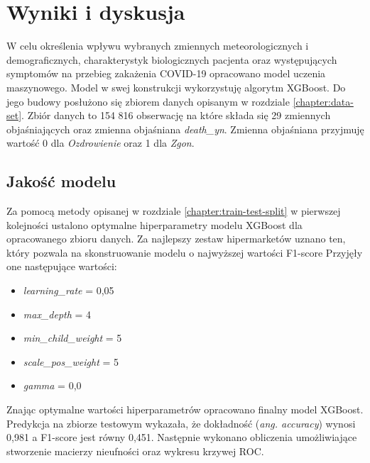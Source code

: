 \documentclass[polish, twoside, 12pt, a4paper]{article}
\theoremstyle{definition}
\theoremstyle{plain}
\theoremstyle{remark}
\begin{document}
\clearpage
\section{Wyniki i dyskusja}


W celu określenia wpływu wybranych zmiennych meteorologicznych i demograficznych, charakterystyk biologicznych pacjenta oraz występujących symptomów na przebieg zakażenia COVID-19 opracowano model uczenia maszynowego. Model w swej konstrukcji wykorzystuję algorytm XGBoost. Do jego budowy posłużono się zbiorem danych opisanym w rozdziale \ref{chapter:data-set}. Zbiór danych to 154 816 obserwację na które składa się 29 zmiennych objaśniających oraz zmienna objaśniana \emph{death\_yn}. Zmienna objaśniana przyjmuję wartość 0 dla \emph{Ozdrowienie} oraz 1 dla \emph{Zgon}.

\subsection{Jakość modelu}

Za pomocą metody opisanej w rozdziale \ref{chapter:train-test-split} w pierwszej kolejności ustalono optymalne hiperparametry modelu XGBoost dla opracowanego zbioru danych. Za najlepszy zestaw hipermarketów uznano ten, który pozwala na skonstruowanie modelu o najwyższej wartości F1-score Przyjęły one następujące wartości:
\begin{itemize}
 \item \emph{learning\_rate} = 0,05
 \item \emph{max\_depth} = 4
 \item \emph{min\_child\_weight} = 5
 \item \emph{scale\_pos\_weight} = 5
 \item \emph{gamma} = 0,0
\end{itemize}

Znając optymalne wartości hiperparametrów opracowano finalny model XGBoost. Predykcja na zbiorze testowym wykazała, że dokładność (\emph{ang. accuracy}) wynosi 0,981 a F1-score jest równy 0,451. Następnie wykonano obliczenia umożliwiające stworzenie macierzy nieufności oraz wykresu krzywej ROC.
\end{document}
